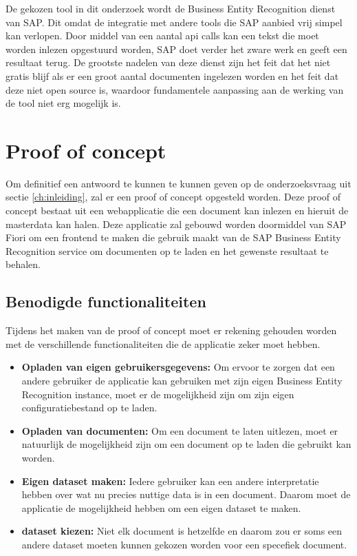 De gekozen tool in dit onderzoek wordt de Business Entity Recognition dienst van SAP. Dit omdat de integratie met andere tools die SAP aanbied vrij simpel kan verlopen. Door middel van een aantal api calls kan een tekst die moet worden inlezen opgestuurd worden, SAP doet verder het zware werk en geeft een resultaat terug. De grootste nadelen van deze dienst zijn het feit dat het niet gratis blijf als er een groot aantal documenten ingelezen worden en het feit dat deze niet open source is, waardoor fundamentele aanpassing aan de werking van de tool niet erg mogelijk is.

\section{Proof of concept}
Om definitief een antwoord te kunnen te kunnen geven op de onderzoeksvraag uit sectie \ref{ch:inleiding}, zal er een proof of concept opgesteld worden. Deze proof of concept bestaat uit een webapplicatie die een document kan inlezen en hieruit de masterdata kan halen. Deze applicatie zal gebouwd worden doormiddel van SAP Fiori om een frontend te maken die gebruik maakt van de SAP Business Entity Recognition service om documenten op te laden en het gewenste resultaat te behalen.
\subsection{Benodigde functionaliteiten}

Tijdens het maken van de proof of concept moet er rekening gehouden worden met de verschillende functionaliteiten die de applicatie zeker moet hebben.

\begin{itemize}
    \item \textbf{Opladen van eigen gebruikersgegevens:} Om ervoor te zorgen dat een andere gebruiker de applicatie kan gebruiken met zijn eigen Business Entity Recognition instance, moet er de mogelijkheid zijn om zijn eigen configuratiebestand op te laden.
    \item \textbf{Opladen van documenten:} Om een document te laten uitlezen, moet er natuurlijk de mogelijkheid zijn om een document op te laden die gebruikt kan worden.
    \item \textbf{Eigen dataset maken:} Iedere gebruiker kan een andere interpretatie hebben over wat nu precies nuttige data is in een document. Daarom moet de applicatie de mogelijkheid hebben om een eigen dataset te maken.
    \item \textbf{dataset kiezen:} Niet elk document is hetzelfde en daarom zou er soms een andere dataset moeten kunnen gekozen worden voor een specefiek document.
\end{itemize}

